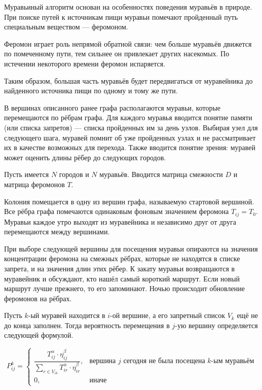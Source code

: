Муравьиный алгоритм основан на особенностях поведения мура­вьёв в природе. При поиске путей к источникам пищи муравьи помечают пройденный путь специальным веществом --- феромоном.

Феромон играет роль непрямой обратной связи: чем больше муравьёв движется по помеченному пути, тем сильнее он привлекает других насекомых. По истечении некоторого времени феромон испаряется.

Таким образом, большая часть муравьёв будет передвигаться от муравейника до найденного источника пищи по одному и тому же пути.

В вершинах описанного ранее графа располагаются муравьи, которые перемещаются по рёбрам графа. Для каждого муравья вводится понятие памяти (или списка за­претов) --- списка пройденных им за день узлов. Выбирая узел для следующего шага, муравей помнит об уже пройденных узлах и не рассмат­ривает их в качестве возможных для перехода. Также вводится понятие зрения: муравей может оценить длины рёбер до следующих городов.

Пусть имеется $N$ городов и $N$ муравьёв. Вводится матрица смеж­ности $D$ и матрица феромонов $T$.

Колония помещается в одну из вершин графа, называемую стар­товой вершиной. Все рёбра графа помечаются одинаковым фоновым зна­чением феромона $T_{ij} = T_0$. Муравьи каждое утро выходят из муравейника и независимо друг от друга перемещаются между вершинами.

При выборе следующей вершины для посещения муравьи опира­ются на значения концентрации феромона на смежных рёбрах, которые не находятся в списке запрета, и на значения длин этих рёбер.
К закату муравьи возвращаются в муравейник и обсуждают, кто нашёл самый короткий маршрут. Если новый маршрут лучше прежнего, то его запоминают. Ночью происходит обновление феромонов на рёбрах.

Пусть $k$-ый муравей находится в $i$-ой вершине, а его запретный список $V_k$ ещё не до конца заполнен. Тогда вероятность перемещения в $j$-ую вершину определяется следующей формулой.

\begin{equation*}
	P_{ij}^k = \begin{cases}
		\dfrac{T_{ij}^\alpha\cdot\eta_{ij}^\beta}{\sum\limits_{r\in V_{ik}} T_{ir}^\alpha\cdot\eta_{ir}^\beta},&\text{вершина $j$ сегодня не была посещена $k$-ым муравьём}\\
		0, & \text{иначе}
	\end{cases}
\end{equation*}
\vspace{5mm}

